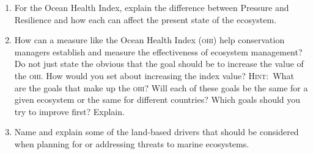 \documentclass[letterpaper]{tufte-handout}
\begin{document}
\begin{enumerate}
	\item For the Ocean Health Index, explain the difference between Pressure and
	Resilience and how each can affect the present state of the ecosystem.
	
	\item How can a measure like the Ocean Health Index (\textsc{ohi}) help 
	conservation managers establish and measure
	the effectiveness of ecosystem management? Do not just state the obvious that 
	the goal should be to increase the value of the \textsc{ohi}. How would
	you set about increasing the index value? \textsc{Hint:}~What are the goals
	that make up the \textsc{ohi}? Will each of these goals be the same for
	a given ecosystem or the same for different countries? Which goals should
	you try to improve first? Explain.
	
	\item Name and explain some of the land-based drivers that should be considered
	when planning for or addressing threats to marine ecosystems.
	
\end{enumerate}
\end{document}
